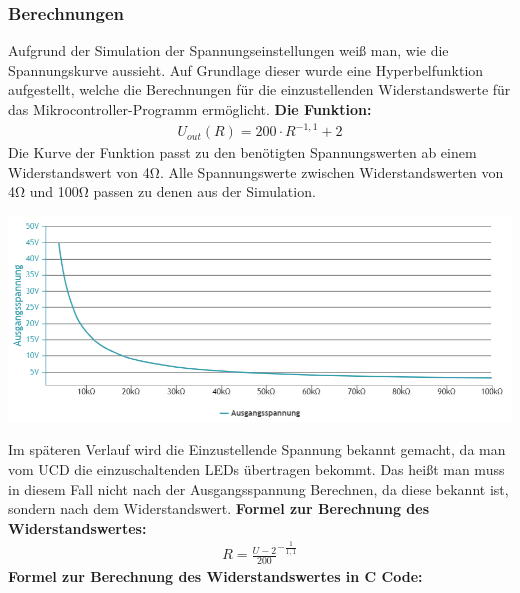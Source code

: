 \documentclass[paper=a4, 12pt]{scrreprt}
\begin{document}
			\subsubsection{Berechnungen}
			Aufgrund der Simulation der Spannungseinstellungen weiß man, wie die Spannungskurve aussieht. Auf Grundlage dieser wurde eine Hyperbelfunktion aufgestellt, welche die Berechnungen für die einzustellenden Widerstandswerte für das Mikrocontroller-Programm ermöglicht. \hfill \break \hfill \break
			\textbf{Die Funktion:} 
			\begin{align*} 
			U_{out}(R) = 200 \cdot R^{-1,1} + 2
			\end{align*}
			Die Kurve der Funktion passt zu den benötigten Spannungswerten ab einem Widerstandswert von 4Ω. Alle Spannungswerte zwischen Widerstandswerten von 4Ω und 100Ω passen zu denen aus der Simulation.
			\begin{adjustbox}{center,caption={Berechneter Spannungsverlauf bei Widerstandsänderung},label={fig:berechnungSPG},nofloat=figure,vspace=\bigskipamount}
				\includegraphics[width=\textwidth]{img/berechnungSPG.PNG}
			\end{adjustbox}
			Im späteren Verlauf wird die Einzustellende Spannung bekannt gemacht, da man vom UCD die einzuschaltenden LEDs übertragen bekommt. Das heißt man muss in diesem Fall nicht nach der Ausgangsspannung Berechnen, da diese bekannt ist, sondern nach dem Widerstandswert. \hfill \break \hfill \break
			\textbf{Formel zur Berechnung des Widerstandswertes:}
			\begin{align*} 
			R=\frac{ U - 2 }{ 200 }^{ -\frac{ 1 }{ 1,1 } }
			\end{align*}
			\textbf{Formel zur Berechnung des Widerstandswertes in C Code:}
			
			\pagebreak
			 
			
\end{document}
